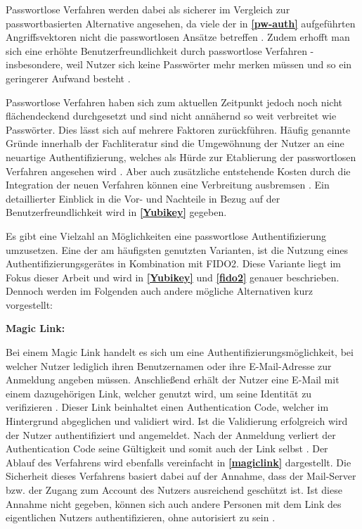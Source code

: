 Passwortlose Verfahren werden dabei als sicherer im Vergleich zur passwortbasierten Alternative angesehen, da viele der in \textbf{\ref{pw-auth}} aufgeführten Angriffsvektoren nicht die passwortlosen Ansätze betreffen \cite{chowhan2019password} \cite{parmar2022comprehensive}. Zudem erhofft man sich eine erhöhte Benutzerfreundlichkeit durch passwortlose Verfahren - insbesondere, weil Nutzer sich keine Passwörter mehr merken müssen und so ein geringerer Aufwand besteht \cite{chowhan2019password}.

Passwortlose Verfahren haben sich zum aktuellen Zeitpunkt jedoch noch nicht flächendeckend durchgesetzt und sind nicht annähernd so weit verbreitet wie Passwörter. Dies lässt sich auf mehrere Faktoren zurückführen. Häufig genannte Gründe innerhalb der Fachliteratur sind die Umgewöhnung der Nutzer an eine neuartige Authentifizierung, welches als Hürde zur Etablierung der passwortlosen Verfahren angesehen wird \cite{chowhan2019password}. Aber auch zusätzliche entstehende Kosten durch die Integration der neuen Verfahren können eine Verbreitung ausbremsen \cite{chowhan2019password}. Ein detaillierter Einblick in die Vor- und Nachteile in Bezug auf der Benutzerfreundlichkeit wird in \textbf{\ref{Yubikey}} gegeben.

Es gibt eine Vielzahl an Möglichkeiten eine passwortlose Authentifizierung umzusetzen. Eine der am häufigsten genutzten Varianten, ist die Nutzung eines Authentifizierungsgerätes in Kombination mit \ac{FIDO}2. Diese Variante liegt im Fokus dieser Arbeit und wird in \textbf{\ref{Yubikey}} und \textbf{\ref{fido2}} genauer beschrieben. Dennoch werden im Folgenden auch andere mögliche Alternativen kurz vorgestellt:

\textbf{Magic Link:}

Bei einem Magic Link handelt es sich um eine
Authentifizierungsmöglichkeit, bei welcher Nutzer
lediglich ihren Benutzernamen oder ihre E-Mail-Adresse
zur Anmeldung angeben müssen. Anschließend erhält der Nutzer eine E-Mail mit einem dazugehörigen Link, welcher genutzt wird, um seine Identität zu verifizieren \cite{chowhan2019password} \cite{parmar2022comprehensive}.
Dieser Link beinhaltet einen Authentication Code, welcher im Hintergrund abgeglichen und validiert wird. Ist die Validierung erfolgreich wird der Nutzer authentifiziert und angemeldet. Nach der Anmeldung verliert der Authentication Code seine Gültigkeit und somit auch der Link selbst \cite{chowhan2019password}. Der Ablauf des Verfahrens wird ebenfalls vereinfacht in \textbf{\ref{magiclink}} dargestellt.
Die Sicherheit dieses Verfahrens basiert dabei auf der Annahme, dass der Mail-Server bzw. der Zugang zum Account des Nutzers ausreichend geschützt ist. Ist diese Annahme nicht gegeben, können sich auch andere Personen mit dem Link des eigentlichen Nutzers authentifizieren, ohne autorisiert zu sein \cite{chowhan2019password}. 

